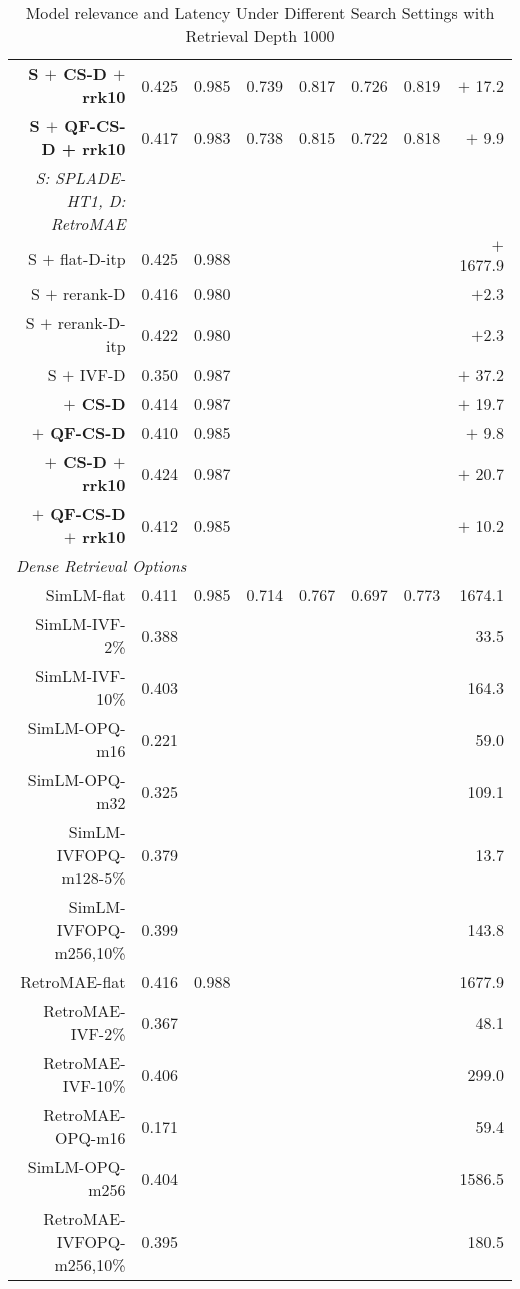 {\begin{table*}[htbp]
\begin{small}
\begin{tabular}{ r r r |r r  |r r  |r}
            \bf S $+$ CS-D $+$  rrk10 & 0.425 & 0.985 & 0.739 & 0.817 & 0.726 & 0.819 & $+$ 17.2 \\
       \bf S $+$ QF-CS-D + rrk10 &  0.417 & 0.983 &  0.738 & 0.815 & 0.722 & 0.818 & $+$ 9.9 \\
            \it  S: SPLADE-HT1, D: RetroMAE&&&&&&&  \\
            S $+$ flat-D-itp  & 0.425 & 0.988 &  & & &  & $+$ 1677.9 \\
            S $+$ rerank-D &  0.416 & 0.980    & & & &  & $+$2.3 \\
            S $+$ rerank-D-itp &  0.422 & 0.980    & & & &  & $+$2.3 \\
            S $+$ IVF-D & 0.350 & 0.987 & & & & &  $+$ 37.2\\
            \bf $+$ CS-D &  0.414 & 0.987 &  &  & & & $+$ 19.7 \\
            \bf $+$ QF-CS-D &  0.410 & 0.985 &  & & &  & $+$ 9.8 \\
           \bf $+$ CS-D $+$ rrk10 &  0.424 & 0.987 &  &  & & & $+$ 20.7 \\
            \bf $+$ QF-CS-D $+$ rrk10 &  0.412 & 0.985 &  & & &  & $+$ 10.2 \\
            \hline
           \multicolumn{7}{l}{\it  Dense Retrieval Options}&  \\
             SimLM-flat & 0.411 & 0.985 & 0.714 & 0.767 &  0.697 & 0.773 & 1674.1\\
             SimLM-IVF-2\% &  0.388 &  &&  && &33.5 \\
             SimLM-IVF-10\% &  0.403 &  &&  && &164.3 \\
             SimLM-OPQ-m16 & 0.221 &  &&  && & 59.0 \\
             SimLM-OPQ-m32 & 0.325 &  &&  && & 109.1 \\
            SimLM-IVFOPQ-m128-5\% & 0.379 &  &&  && &13.7 \\
            SimLM-IVFOPQ-m256,10\% & 0.399 &  &&  && & 143.8 \\
              RetroMAE-flat & 0.416 & 0.988 &&  && & 1677.9 \\
               RetroMAE-IVF-2\% &  0.367 &  &&  && &48.1 \\
              RetroMAE-IVF-10\% &  0.406 &  &&  && &299.0 \\
              RetroMAE-OPQ-m16 & 0.171 &  &&  && & 59.4 \\
             SimLM-OPQ-m256 & 0.404 &  &&  && & 1586.5 \\
             RetroMAE-IVFOPQ-m256,10\% & 0.395 &  &&  && & 180.5 \\
			\hline\hline
		\end{tabular}
		\end{small}
	\caption{Model relevance and Latency Under Different Search Settings with Retrieval Depth 1000
}
	\label{tab:main1k}
\end{table*}
}
